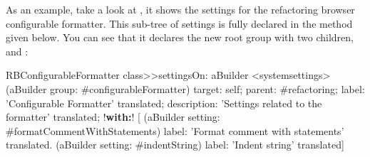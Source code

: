 \documentclass[a4paper,10pt,twoside]{book}
\begin{document}
As an example, take a look at , it shows the settings for the refactoring browser configurable formatter. This sub-tree of settings is fully declared in the method  given below. You can see that it declares the new root group  with two children,  and :
\begin{code}{}
RBConfigurableFormatter class>>settingsOn: aBuilder
	<systemsettings>	
	(aBuilder group: #configurableFormatter)
		target: self;
		parent: #refactoring;
		label: 'Configurable Formatter' translated;
		description: 'Settings related to the formatter' translated;
		!\textbf{with:}! [
				(aBuilder setting: #formatCommentWithStatements)
					label: 'Format comment with statements' translated.
				(aBuilder setting: #indentString)
					label: 'Indent string' translated]
\end{code}
\end{document}
